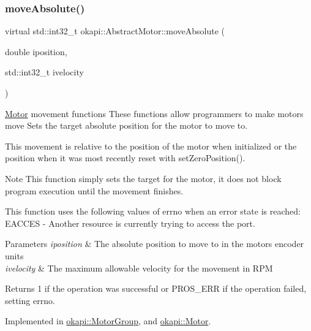 \mbox{\label{classokapi_1_1AbstractMotor_ab84ff0f3e39fa14dcf74bcc867863ff8}} 
\subsubsection{\texorpdfstring{moveAbsolute()}{moveAbsolute()}}
{\footnotesize\ttfamily virtual std\+::int32\+\_\+t okapi\+::\+Abstract\+Motor\+::move\+Absolute (\begin{DoxyParamCaption}\item[{double}]{iposition,  }\item[{std\+::int32\+\_\+t}]{ivelocity }\end{DoxyParamCaption})\hspace{0.3cm}{\ttfamily [pure virtual]}}

\mbox{\hyperlink{classokapi_1_1Motor}{Motor}} movement functions These functions allow programmers to make motors move Sets the target absolute position for the motor to move to.

This movement is relative to the position of the motor when initialized or the position when it was most recently reset with set\+Zero\+Position().

\begin{DoxyNote}{Note}
This function simply sets the target for the motor, it does not block program execution until the movement finishes.
\end{DoxyNote}
This function uses the following values of errno when an error state is reached\+: E\+A\+C\+C\+ES -\/ Another resource is currently trying to access the port.


\begin{DoxyParams}{Parameters}
{\em iposition} & The absolute position to move to in the motor\textquotesingle{}s encoder units \\
\hline
{\em ivelocity} & The maximum allowable velocity for the movement in R\+PM \\
\hline
\end{DoxyParams}
\begin{DoxyReturn}{Returns}
1 if the operation was successful or P\+R\+O\+S\+\_\+\+E\+RR if the operation failed, setting errno. 
\end{DoxyReturn}


Implemented in \mbox{\hyperlink{classokapi_1_1MotorGroup_afe6800639a995d37d8963c72fb8526d4}{okapi\+::\+Motor\+Group}}, and \mbox{\hyperlink{classokapi_1_1Motor_a5f95fd5864805b57f16fa5defdbf1968}{okapi\+::\+Motor}}.

